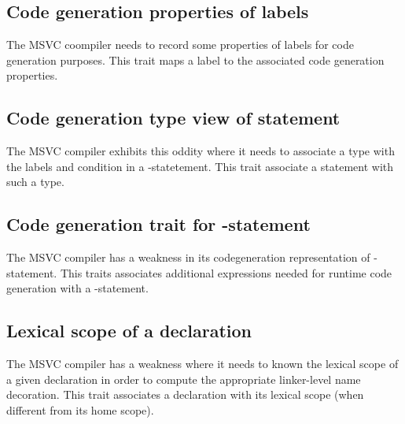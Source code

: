 \subsection{Code generation properties of labels}
\label{sec:ifc-msvc-codegen-labels-properties-trait}

The MSVC coompiler needs to record some properties of labels for code generation purposes.
This trait maps a label to the associated code generation properties.




\subsection{Code generation type view of  statement}
\label{sec:ifc-msvc-codegen-switch-type-trait}

The MSVC compiler exhibits this oddity where it needs to associate a type with the labels and condition in a -statetement.
This trait associate a  statement with such a type.



\subsection{Code generation trait for -statement}
\label{sec:ifc-msvc-codegen-do-stmt-trait}

The MSVC compiler has a weakness in its codegeneration representation of -statement.  This traits associates
additional expressions needed for runtime code generation with a -statement.



\subsection{Lexical scope of a declaration}
\label{sec:ifc-msvc-lexical-scope-trait}

The MSVC compiler has a weakness where it needs to known the lexical scope of a given declaration in order to compute the appropriate linker-level name decoration.
This trait associates a declaration with its lexical scope (when different from its home scope).

